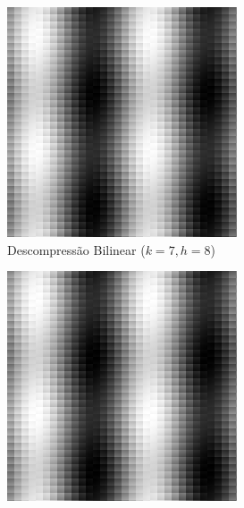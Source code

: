 \documentclass[12pt, a4paper]{article}
\begin{document}
\begin{figure}[H]
    \vspace{0.5cm}
    
    \begin{subfigure}[b]{0.45\textwidth}
        \centering
        \includegraphics[width=\textwidth]{results/case_5/bilinear_decompressed_k7_h8.png}
        \caption{Descompressão Bilinear ($k=7, h=8$)}
        \label{fig:zoo_bilinear_k7h8}
    \end{subfigure}
    \hfill
    \begin{subfigure}[b]{0.45\textwidth}
        \centering
        \includegraphics[width=\textwidth]{results/case_5/bicubic_decompressed_k7_h8.png}

\end{subfigure}
\end{figure}
\end{document}
